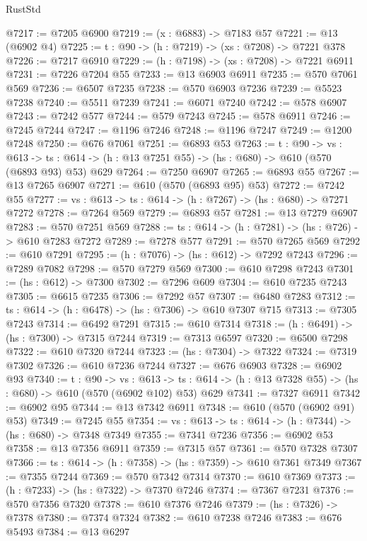 \begin{lexlean}{RustStd}
\begin{coremodule}
@7217 := @7205 @6900
@7219 := (x : @6883) -> @7183 @57
@7221 := @13 (@6902 @4)
@7225 := {t : @90} -> (h : @7219) -> (xs : @7208) -> @7221 @378
@7226 := @7217 @6910
@7229 := (h : @7198) -> (xs : @7208) -> @7221 @6911
@7231 := @7226 @7204 @55
@7233 := @13 @6903 @6911
@7235 := @570 @7061 @569
@7236 := @6507 @7235
@7238 := @570 @6903 @7236
@7239 := @5523 @7238
@7240 := @5511 @7239
@7241 := @6071 @7240
@7242 := @578 @6907
@7243 := @7242 @577
@7244 := @579 @7243
@7245 := @578 @6911
@7246 := @7245 @7244
@7247 := @1196 @7246
@7248 := @1196 @7247
@7249 := @1200 @7248
@7250 := @676 @7061
@7251 := @6893 @53
@7263 := {t : @90} ->
  {vs : @613} ->
  {ts : @614} -> (h : @13 @7251 @55) -> (hs : @680) -> @610 (@570 (@6893 @93) @53) @629
@7264 := @7250 @6907
@7265 := @6893 @55
@7267 := @13 @7265 @6907
@7271 := @610 (@570 (@6893 @95) @53)
@7272 := @7242 @55
@7277 := {vs : @613} -> {ts : @614} -> (h : @7267) -> (hs : @680) -> @7271 @7272
@7278 := @7264 @569
@7279 := @6893 @57
@7281 := @13 @7279 @6907
@7283 := @570 @7251 @569
@7288 := {ts : @614} -> (h : @7281) -> (hs : @726) -> @610 @7283 @7272
@7289 := @7278 @577
@7291 := @570 @7265 @569
@7292 := @610 @7291
@7295 := (h : @7076) -> (hs : @612) -> @7292 @7243
@7296 := @7289 @7082
@7298 := @570 @7279 @569
@7300 := @610 @7298 @7243
@7301 := (hs : @612) -> @7300
@7302 := @7296 @609
@7304 := @610 @7235 @7243
@7305 := @6615 @7235
@7306 := @7292 @57
@7307 := @6480 @7283
@7312 := {ts : @614} -> (h : @6478) -> (hs : @7306) -> @610 @7307 @715
@7313 := @7305 @7243
@7314 := @6492 @7291
@7315 := @610 @7314
@7318 := (h : @6491) -> (hs : @7300) -> @7315 @7244
@7319 := @7313 @6597
@7320 := @6500 @7298
@7322 := @610 @7320 @7244
@7323 := (hs : @7304) -> @7322
@7324 := @7319 @7302
@7326 := @610 @7236 @7244
@7327 := @676 @6903
@7328 := @6902 @93
@7340 := {t : @90} ->
  {vs : @613} ->
  {ts : @614} -> (h : @13 @7328 @55) -> (hs : @680) -> @610 (@570 (@6902 @102) @53) @629
@7341 := @7327 @6911
@7342 := @6902 @95
@7344 := @13 @7342 @6911
@7348 := @610 (@570 (@6902 @91) @53)
@7349 := @7245 @55
@7354 := {vs : @613} -> {ts : @614} -> (h : @7344) -> (hs : @680) -> @7348 @7349
@7355 := @7341 @7236
@7356 := @6902 @53
@7358 := @13 @7356 @6911
@7359 := @7315 @57
@7361 := @570 @7328 @7307
@7366 := {ts : @614} -> (h : @7358) -> (hs : @7359) -> @610 @7361 @7349
@7367 := @7355 @7244
@7369 := @570 @7342 @7314
@7370 := @610 @7369
@7373 := (h : @7233) -> (hs : @7322) -> @7370 @7246
@7374 := @7367 @7231
@7376 := @570 @7356 @7320
@7378 := @610 @7376 @7246
@7379 := (hs : @7326) -> @7378
@7380 := @7374 @7324
@7382 := @610 @7238 @7246
@7383 := @676 @5493
@7384 := @13 @6297

\end{coremodule}
\end{lexlean}
